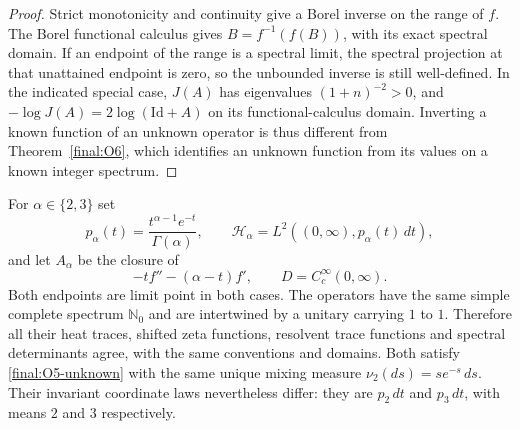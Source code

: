 \begin{proof}
Strict monotonicity and continuity give a Borel inverse on the range
of $f$.  The Borel functional calculus gives
$B=f^{-1}(f(B))$, with its exact spectral domain.  If an endpoint of
the range is a spectral limit, the spectral projection at that
unattained endpoint is zero, so the unbounded inverse is still
well-defined.  In the indicated special case, $J(A)$ has eigenvalues
$(1+n)^{-2}>0$, and
$-\log J(A)=2\log(\mathrm{Id}+A)$ on its functional-calculus domain.
Inverting a known function of an unknown operator is thus different
from Theorem~\ref{final:O6}, which identifies an unknown function
from its values on a known integer spectrum.
\end{proof}

\begin{theorem}
\label{final:O5-isospectral-boundary}
For $\alpha\in\{2,3\}$ set
\[
 p_\alpha(t)=\frac{t^{\alpha-1}e^{-t}}{\Gamma(\alpha)},
 \qquad \mathcal H_\alpha=L^2((0,\infty),p_\alpha(t)\,dt),
\]
and let $A_\alpha$ be the closure of
\[
 -tf''-(\alpha-t)f',\qquad D=C_c^\infty(0,\infty).
\]
Both endpoints are limit point in both cases.  The operators have
the same simple complete spectrum $\mathbb N_0$ and are intertwined
by a unitary carrying $1$ to $1$.  Therefore all their heat traces,
shifted zeta functions, resolvent trace functions and spectral
determinants agree, with the same conventions and domains.
Both satisfy \eqref{final:O5-unknown} with the same unique mixing
measure $\nu_2(ds)=se^{-s}\,ds$.  Their invariant coordinate laws
nevertheless differ: they are $p_2\,dt$ and
$p_3\,dt$, with means $2$ and $3$ respectively.
\end{theorem}

